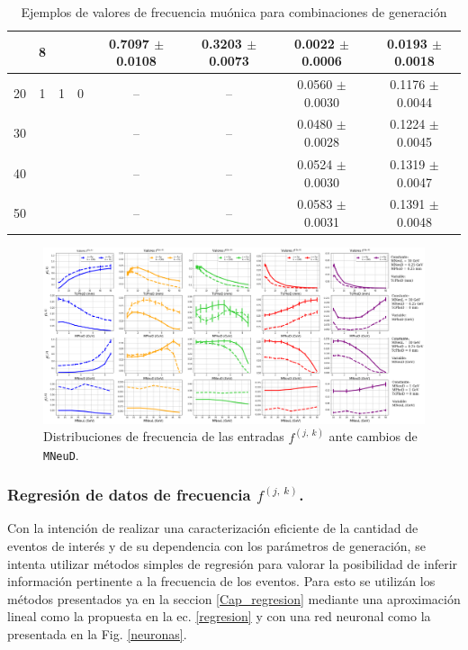 \begin{table}
\begin{scriptsize}
\begin{tabular}{|cccccccc|}
& 8 & & & 0.7097 $\pm$ 0.0108 & 0.3203 $\pm$ 0.0073 & 0.0022 $\pm$ 0.0006 & 0.0193 $\pm$ 0.0018\\
\hline
20 & 1 & 1 & 0 & -- & -- & 0.0560 $\pm$ 0.0030 & 0.1176 $\pm$ 0.0044 \\
30 & & & &  --  & -- & 0.0480 $\pm$ 0.0028 & 0.1224 $\pm$ 0.0045\\
40 & & & & -- & -- &  0.0524 $\pm$ 0.0030 &  0.1319 $\pm$ 0.0047 \\
50 & & & & -- & -- & 0.0583 $\pm$ 0.0031 & 0.1391 $\pm$ 0.0048 \\
\hline
\end{tabular}
\caption{Ejemplos de valores de frecuencia muónica para combinaciones de generación}
\label{Numero_de_Entradas}
\end{scriptsize}
\end{table}

\begin{figure}[h]
\centering
\includegraphics[width=.95\textwidth]{Simulacion/imagenes/Comparacion_Distribucion_Entries.png}
\caption{Distribuciones de frecuencia de las entradas $f^{(j,~k)}$ ante cambios de \texttt{MNeuD}.}
\label{entradasALL}
\end{figure}

\subsubsection{Regresión de datos de frecuencia $f^{(j,~k)}$.}

Con la intención de realizar una caracterización eficiente de la cantidad de eventos de interés y de su dependencia con los parámetros de generación, se intenta utilizar métodos simples de regresión para valorar la posibilidad de inferir información pertinente a la frecuencia de los eventos. Para esto se utilizán los métodos presentados ya en la seccion \ref{Cap_regresion} mediante una aproximación lineal como la propuesta en la ec. \ref{regresion} y con una red neuronal como la presentada en la Fig. \ref{neuronas}.

